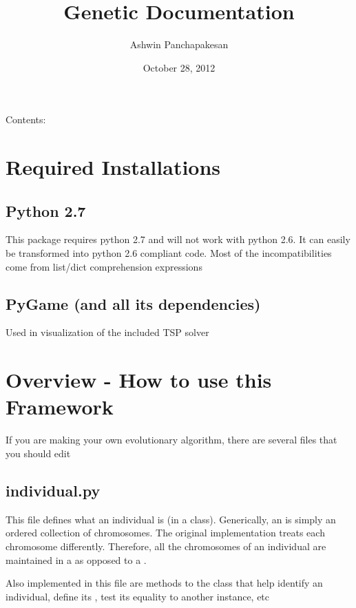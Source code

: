 \documentclass[letterpaper,10pt,english]{sphinxmanual}
\title{Genetic Documentation}
\date{October 28, 2012}
\author{Ashwin Panchapakesan}
\begin{document}
\maketitle
\tableofcontents
{}\label{index::doc}


Contents:


\chapter{Required Installations}
\label{Required Installs:required-installations}\label{Required Installs::doc}\label{Required Installs:welcome-to-genetic-s-documentation}

\section{Python 2.7}
\label{Required Installs:python-2-7}
This package requires python 2.7 and will not work with python 2.6.
It can easily be transformed into python 2.6 compliant code. Most of the incompatibilities come from list/dict comprehension expressions


\section{PyGame (and all its dependencies)}
\label{Required Installs:pygame-and-all-its-dependencies}
Used in visualization of the included TSP solver


\chapter{Overview - How to use this Framework}
\label{Overview:overview-how-to-use-this-framework}\label{Overview::doc}
If you are making your own evolutionary algorithm, there are several files that you should edit


\section{individual.py}
\label{Overview:individual-py}
This file defines what an individual is (in a class). Generically, an  is simply an ordered collection of chromosomes. The original implementation treats each chromosome differently. Therefore, all the chromosomes of an individual are maintained in a  as opposed to a .

Also implemented in this file are methods to the  class that help identify an individual, define its , test its equality to another  instance, etc
\end{document}
